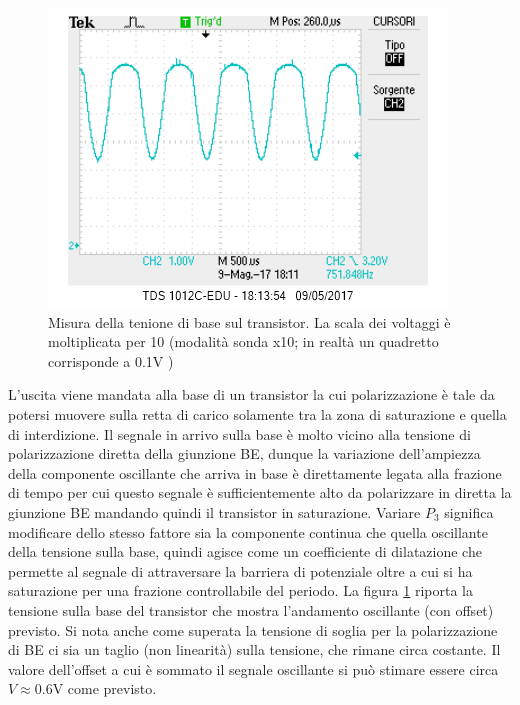 \documentclass[10pt,a4paper]{article}
\begin{document}
\begin{figure}[!htb]
  \centering
\includegraphics[scale=0.7]{baseq2.png}
\caption{Misura della tenione di base sul transistor. La scala dei voltaggi è moltiplicata per 10 (modalità sonda x10; in realtà un quadretto corrisponde a 0.1V ) \label{base}}
\end{figure}


L'uscita viene mandata alla base di un transistor la cui polarizzazione è tale da potersi muovere sulla retta di carico solamente  tra la zona di saturazione e quella di interdizione. Il segnale in arrivo sulla base è molto vicino alla tensione di polarizzazione diretta della giunzione BE, dunque la variazione dell'ampiezza della componente oscillante che arriva in base è direttamente legata alla frazione di tempo per cui questo segnale è sufficientemente alto da polarizzare in diretta la giunzione BE mandando quindi il transistor in saturazione. Variare $P_3$ significa modificare dello stesso fattore sia la componente continua che quella oscillante della tensione sulla base, quindi agisce come un coefficiente di dilatazione che permette al segnale di attraversare la barriera di potenziale oltre a cui si ha saturazione per una frazione controllabile del periodo. La figura \ref{base} riporta la tensione sulla base del transistor che mostra l'andamento oscillante (con offset) previsto. Si nota anche come superata la tensione di soglia per la polarizzazione di BE ci sia un taglio (non linearità) sulla tensione, che rimane circa costante. Il valore dell'offset a cui è sommato il segnale oscillante si può stimare essere circa $V \approx 0.6$V come previsto.

\end{document}
